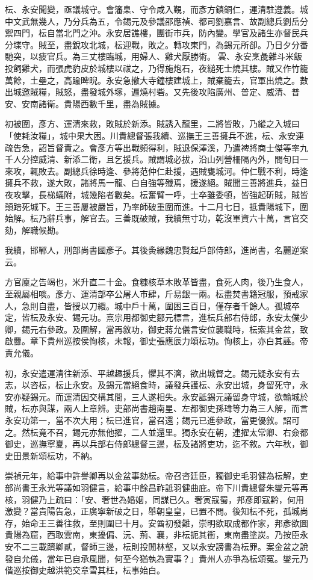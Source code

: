 \begin{pinyinscope}
{{枟、永安聞變，亟議城守。會籓臬、守令咸入覲，而彥方鎮銅仁，運清駐遵義。城中文武無幾人，乃分兵為五，令錫元及參議邵應禎、都司劉嘉言、故副總兵劉岳分禦四門，枟自當北門之沖。永安居譙樓，團街市兵，防內變。學官及諸生亦督民兵分堞守。賊至，盡銳攻北城，枟迎戰，敗之。轉攻東門，為錫元所卻。乃日夕分番馳突，以疲官兵。為三丈樓臨城，用婦人、雞犬厭勝術。雲、永安烹彘雜斗米飯投飼雞犬，而張虎豹皮於城樓以祓之，乃得施炮石，夜縋死士燒其樓。賊又作竹籠萬餘，土壘之，高踰睥睨。永安急撤大寺鐘樓建城上，賊棄籠去，官軍出燒之。數出城邀賊糧，賊怒，盡發城外塚，遍燒村砦。又先後攻陷廣州、普定、威清、普安、安南諸衛。貴陽西數千里，盡為賊據。

初被圍，彥方、運清來救，敗賊於新添。賊誘入龍里，二將皆敗，乃縱之入城曰「使耗汝糧」，城中果大困。川貴總督張我續、巡撫王三善擁兵不進，枟、永安連疏告急，詔旨督責之。會彥方等出戰頻得利，賊退保澤溪，乃遣裨將商士傑等率九千人分控威清、新添二衛，且乞援兵。賊謂城必拔，沿山列營柵隔內外，間旬日一來攻，輒敗去。副總兵徐時逢、參將范仲仁赴援，遇賊甕城河。仲仁戰不利，時逢擁兵不救，遂大敗，諸將馬一龍、白自強等殲焉，援遂絕。賊聞三善將進兵，益日夜攻擊，長梯蟻附，城幾陷者數矣。枟奮臂一呼，士卒雖委頓，皆強起斫賊，賊皆顛踣死城下。王三善屢被嚴旨，乃率師破重圍而進。十二月七日，抵貴陽城下，圍始解。枟乃辭兵事，解官去。三善既破賊，我續無寸功，乾沒軍資六十萬，言官交劾，解職候勘。

我續，邯鄲人，刑部尚書國彥子。其後夤緣魏忠賢起戶部侍郎，進尚書，名麗逆案云。

方官廩之告竭也，米升直二十金。食糠核草木敗革皆盡，食死人肉，後乃生食人，至親屬相啖。彥方、運清部卒公屠人市肆，斤易銀一兩。枟盡焚書籍冠服，預戒家人，急則自盡，皆授以刀繯。城中戶十萬，圍困三百日，僅存者千餘人。孤城卒定，皆枟及永安、錫元功。熹宗用都御史鄒元標言，進枟兵部右侍郎，永安太僕少卿，錫元右參政。及圍解，當再敘功，御史蔣允儀言安位襲職時，枟索其金盆，致啟釁。章下貴州巡按侯恂核，未報，御史張應辰力頌枟功。恂核上，亦白其誣。帝責允儀。

初，永安遣運清往新添、平越趣援兵，懼其不濟，欲出城督之。錫元疑永安有去志，以咨枟，枟止永安。及錫元當絕食時，議發兵護枟、永安出城，身留死守，永安亦疑錫元。而運清因交構其間，三人遂相失。永安詆錫元議留身守城，欲輸城於賊，枟亦與謀，兩人上章辨。吏部尚書趙南星、左都御史孫瑋等力為三人解，而言永安功第一，當不次大用；枟已進官，當召還；錫元已進參政，當更優敘。詔可之。然枟竟不召，錫元亦無他擢，二人並還里。獨永安在朝，連擢太常卿、右僉都御史，巡撫寧夏，再以兵部右侍郎總督三邊，枟及諸將吏功，迄不敘。六年秋，御史田景新頌枟功，不納。

崇禎元年，給事中許譽卿再以金盆事劾枟。帝召咨廷臣，獨御史毛羽健為枟解，吏部尚書王永光等議如羽健言，給事中餘昌祚詆羽健曲庇。帝下川貴總督朱燮元等再核，羽健乃上疏曰：「安、奢世為婚姻，同謀已久。奢寅寇蜀，邦彥即寇黔，何用激變？當貴陽告急，正廣寧新破之日，舉朝皇皇，已置不問。後知枟不死，孤城尚存，始命王三善往救，至則圍已十月。安酋初發難，崇明欲取成都作家，邦彥欲圖貴陽為窟，西取雲南，東擾偏、沅、荊、襄，非枟扼其衝，東南盡塗炭。乃按臣永安不二三載躋卿貳，督師三邊，枟則投閒林壑，又以永安謗書為枟罪。案金盆之說發自允儀，當年已自承風聞，何至今猶執為實事？」貴州人亦爭為枟頌冤。燮元乃偕巡按御史越洪範交章雪其枉，枟事始白。

}}
\end{pinyinscope}

